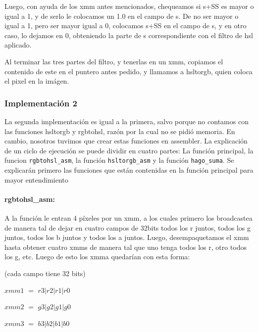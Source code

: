 \documentclass[a4paper]{article}
\begin{document}
Luego, con ayuda de los xmm antes mencionados, chequeamos si s+SS es mayor o igual a 1, y de serlo le colocamos un 1.0 en el campo de s. De no ser mayor o igual a 1, pero ser mayor igual a 0, colocamos s+SS en el campo de s, y en otro caso, lo dejamos en 0, obteniendo la parte de s correspondiente con el filtro de hsl aplicado. 

Al terminar las tres partes del filtro, y tenerlas en un xmm, copiamos el contenido de este en el puntero antes pedido, y llamamos a hsltorgb, quien coloca el pixel en la imágen.

\subsubsection{Implementación 2}
La segunda implementación es igual a la primera, salvo porque no contamos con las funciones hsltorgb y rgbtohsl, razón por la cual no se pidió memoria. En cambio, nosotros tuvimos que crear estas funciones en assembler. La explicación de un ciclo de ejecución se puede dividir en cuatro partes: La función principal, la funcion {\tt rgbtohsl\_asm}, la función {\tt hsltorgb\_asm} y la función {\tt hago\_suma}. Se explicarán primero las funciones que están contenidas en la función principal para mayor entendimiento

\paragraph*{rgbtohsl_asm:}

A la función le entran 4 píxeles por un xmm, a los cuales primero los broadcastea de manera tal de dejar en cuatro campos de 32bits todos los r juntos, todos los g juntos, todos los b juntos y todos los a juntos. Luego, desempaquetamos el xmm hasta obtener cuatro xmms de manera tal que uno tenga todos los r, otro todos los g, etc. Luego de esto los xmma quedarían con esta forma:

\vspace*{0.3cm}

(cada campo tiene 32 bits)

\vspace*{0.3cm}

 $xmm1$ $=$ $r3|r2|r1|r0$

\vspace*{0.3cm}

 $xmm2$ $=$ $g3|g2|g1|g0$

\vspace*{0.3cm}

 $xmm3$ $=$ $b3|b2|b1|b0$
\end{document}
